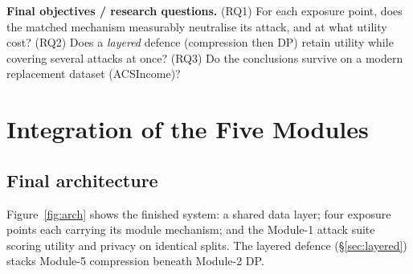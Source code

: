 \documentclass[11pt,a4paper]{article}
\begin{document}
\noindent\textbf{Final objectives / research questions.}
(RQ1) For each exposure point, does the matched mechanism measurably neutralise
its attack, and at what utility cost? (RQ2) Does a \emph{layered} defence
(compression then DP) retain utility while covering several attacks at once?
(RQ3) Do the conclusions survive on a modern replacement dataset (ACSIncome)?

\section{Integration of the Five Modules}\label{sec:integrate}
\subsection{Final architecture}
Figure~\ref{fig:arch} shows the finished system: a shared data layer; four
exposure points each carrying its module mechanism; and the Module-1 attack
suite scoring utility and privacy on identical splits. The layered defence
(\S\ref{sec:layered}) stacks Module-5 compression beneath Module-2 DP.
\end{document}
